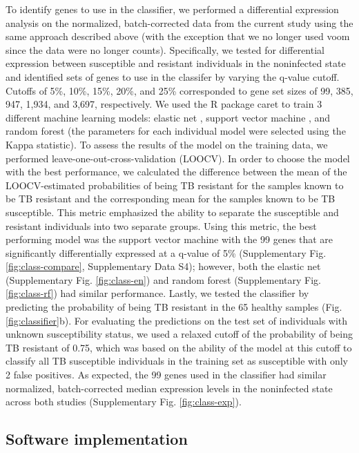 \documentclass[fleqn,10pt]{wlscirep}
\begin{document}
To identify genes to use in the classifier, we performed a
differential expression analysis on the normalized, batch-corrected
data from the current study using the same approach described above
(with the exception that we no longer used voom \cite{Law2014} since
the data were no longer counts). Specifically, we tested for
differential expression between susceptible and resistant individuals
in the noninfected state and identified sets of genes to use in the
classifer by varying the q-value cutoff. Cutoffs of 5\%, 10\%, 15\%,
20\%, and 25\% corresponded to gene set sizes of 99, 385, 947, 1,934,
and 3,697, respectively. We used the R package caret \cite{Kuhn2008}
to train 3 different machine learning models: elastic net
\cite{Friedman2010}, support vector machine \cite{Karatzoglou2004},
and random forest \cite{Liaw2002} (the parameters for each individual
model were selected using the Kappa statistic). To assess the results
of the model on the training data, we performed
leave-one-out-cross-validation (LOOCV). In order to choose the model
with the best performance, we calculated the difference between the
mean of the LOOCV-estimated probabilities of being TB resistant for
the samples known to be TB resistant and the corresponding mean for
the samples known to be TB susceptible. This metric emphasized the
ability to separate the susceptible and resistant individuals into two
separate groups. Using this metric, the best performing model was the
support vector machine with the 99 genes that are significantly
differentially expressed at a q-value of 5\% (Supplementary Fig.
\ref{fig:class-compare}, Supplementary Data S4); however, both the
elastic net (Supplementary Fig. \ref{fig:class-en}) and random forest
(Supplementary Fig. \ref{fig:class-rf}) had similar performance.
Lastly, we tested the classifier by predicting the probability of
being TB resistant in the 65 healthy samples (Fig.
\ref{fig:classifier}b). For evaluating the predictions on the test set
of individuals with unknown susceptibility status, we used a relaxed
cutoff of the probability of being TB resistant of 0.75, which was
based on the ability of the model at this cutoff to classify all TB
susceptible individuals in the training set as susceptible with only 2
false positives. As expected, the 99 genes used in the classifier had
similar normalized, batch-corrected median expression levels in the
noninfected state across both studies (Supplementary Fig.
\ref{fig:class-exp}).
\subsection*{Software implementation}
\end{document}
